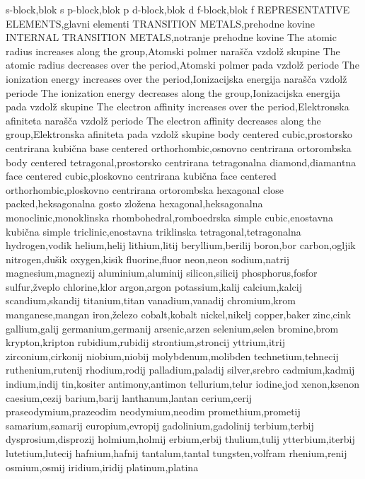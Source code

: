 s-block,blok s
p-block,blok p
d-block,blok d
f-block,blok f
REPRESENTATIVE ELEMENTS,glavni elementi
TRANSITION METALS,prehodne kovine
INTERNAL TRANSITION METALS,notranje prehodne kovine
The atomic radius increases along the group,Atomski polmer narašča vzdolž skupine
The atomic radius decreases over the period,Atomski polmer pada vzdolž periode
The ionization energy increases over the period,Ionizacijska energija narašča vzdolž periode
The ionization energy decreases along the group,Ionizacijska energija pada vzdolž skupine
The electron affinity increases over the period,Elektronska afiniteta narašča vzdolž periode
The electron affinity decreases along the group,Elektronska afiniteta pada vzdolž skupine
body centered cubic,prostorsko centrirana kubična
base centered orthorhombic,osnovno centrirana ortorombska
body centered tetragonal,prostorsko centrirana tetragonalna
diamond,diamantna
face centered cubic,ploskovno centrirana kubična
face centered orthorhombic,ploskovno centrirana ortorombska
hexagonal close packed,heksagonalna gosto zložena
hexagonal,heksagonalna
monoclinic,monoklinska
rhombohedral,romboedrska
simple cubic,enostavna kubična
simple triclinic,enostavna triklinska
tetragonal,tetragonalna
hydrogen,vodik
helium,helij
lithium,litij
beryllium,berilij
boron,bor
carbon,ogljik
nitrogen,dušik
oxygen,kisik
fluorine,fluor
neon,neon
sodium,natrij
magnesium,magnezij
aluminium,aluminij
silicon,silicij
phosphorus,fosfor
sulfur,žveplo
chlorine,klor
argon,argon
potassium,kalij
calcium,kalcij
scandium,skandij
titanium,titan
vanadium,vanadij
chromium,krom
manganese,mangan
iron,železo
cobalt,kobalt
nickel,nikelj
copper,baker
zinc,cink
gallium,galij
germanium,germanij
arsenic,arzen
selenium,selen
bromine,brom
krypton,kripton
rubidium,rubidij
strontium,stroncij
yttrium,itrij
zirconium,cirkonij
niobium,niobij
molybdenum,molibden
technetium,tehnecij
ruthenium,rutenij
rhodium,rodij
palladium,paladij
silver,srebro
cadmium,kadmij
indium,indij
tin,kositer
antimony,antimon
tellurium,telur
iodine,jod
xenon,ksenon
caesium,cezij
barium,barij
lanthanum,lantan
cerium,cerij
praseodymium,prazeodim
neodymium,neodim
promethium,prometij
samarium,samarij
europium,evropij
gadolinium,gadolinij
terbium,terbij
dysprosium,disprozij
holmium,holmij
erbium,erbij
thulium,tulij
ytterbium,iterbij
lutetium,lutecij
hafnium,hafnij
tantalum,tantal
tungsten,volfram
rhenium,renij
osmium,osmij
iridium,iridij
platinum,platina
